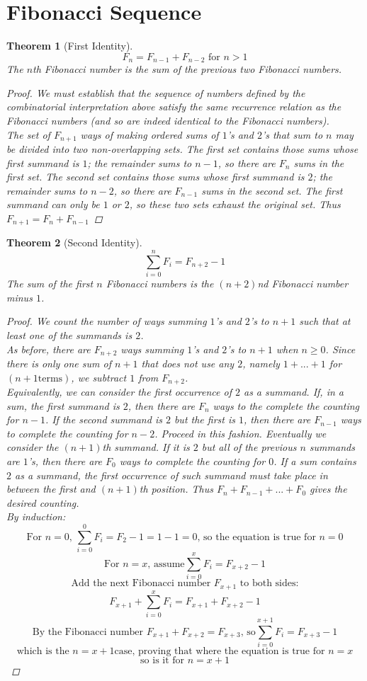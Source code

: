 \documentclass[10pt]{report}
\newtheorem{thm2}{Theorem}[section]
\begin{document}
\section{Fibonacci Sequence}
\begin{thm2}[First Identity]
$$F_n=F_{n-1}+F_{n-2}\text{ for }n>1$$
The $n$th Fibonacci number is the sum of the previous two Fibonacci numbers.
\begin{proof}
We must establish that the sequence of numbers defined by the combinatorial interpretation above satisfy the same recurrence relation as the Fibonacci numbers (and so are indeed identical to the Fibonacci numbers).\\
The set of $F_{n + 1}$ ways of making ordered sums of $1$'s and $2$'s that sum to $n$ may be divided into two non-overlapping sets. The first set contains those sums whose first summand is $1$; the remainder sums to $n-1$, so there are $F_{n}$ sums in the first set. The second set contains those sums whose first summand is $2$; the remainder sums to $n-2$, so there are $F_{n-1}$ sums in the second set. The first summand can only be $1$ or $2$, so these two sets exhaust the original set. Thus $F_{n+1} = F_{n}+F_{n-1}$
\end{proof}
\end{thm2}
\begin{thm2}[Second Identity]
$$\sum_{i=0}^n F_i=F_{n+2}-1$$
The sum of the first $n$ Fibonacci numbers is the $(n+2)$nd Fibonacci number minus $1$.
\begin{proof}
We count the number of ways summing $1$'s and $2$'s to $n + 1$ such that at least one of the summands is $2$.\\
As before, there are $F_{n + 2}$ ways summing $1$'s and $2$'s to $n + 1$ when $n\geq 0$. Since there is only one sum of $n + 1$ that does not use any $2$, namely $1 + ... + 1$ for $(n + 1 \text{terms})$, we subtract $1$ from $F_{n + 2}$.\\
Equivalently, we can consider the first occurrence of $2$ as a summand. If, in a sum, the first summand is $2$, then there are $F_{n}$ ways to the complete the counting for $n-1$. If the second summand is $2$ but the first is $1$, then there are $F_{n-1}$ ways to complete the counting for $n-2$. Proceed in this fashion. Eventually we consider the $(n + 1)$th summand. If it is $2$ but all of the previous $n$ summands are $1$'s, then there are $F_{0}$ ways to complete the counting for $0$. If a sum contains $2$ as a summand, the first occurrence of such summand must take place in between the first and $(n + 1)$th position. Thus $F_{n} + F_{n − 1} + ... + F_{0}$ gives the desired counting.\\
By induction:
$$\text{For }n=0\text{, }\sum_{i=0}^0 F_i=F_2 -1=1-1=0 \text{, so the equation is true for }n=0$$
$$\text{For }n=x\text{, assume}\sum_{i=0}^x F_i =F_{x+2}-1$$
$$\text{Add the next Fibonacci number } F_{x+1}\text{ to both sides:}$$
$$F_{x+1}+\sum_{i=0}^x F_i =F_{x+1}+F_{x+2}-1$$
$$\text{By the Fibonacci number } F_{x+1}+F_{x+2}=F_{x+3}\text{, so}\sum_{i=0}^{x+1}F_i=F_{x+3}-1$$
$$\text{which is the }n=x+1\text{case, proving that where the equation is true for }n=x$$
$$\text{so is it for }n=x+1$$
\end{proof}
\end{thm2}
\end{document}

